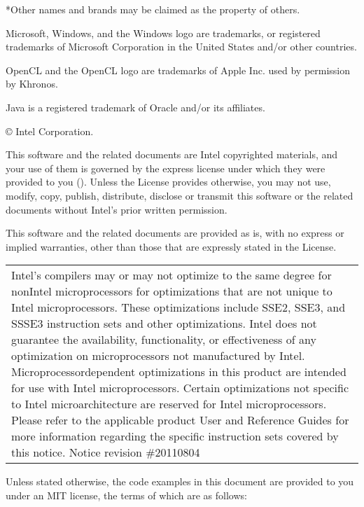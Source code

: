 \documentclass[letterpaper,10pt,english]{sphinxmanual}
\begin{document}
*Other names and brands may be claimed as the property of others.

Microsoft, Windows, and the Windows logo are trademarks, or registered
trademarks of Microsoft Corporation in the United States and/or other
countries.

OpenCL and the OpenCL logo are trademarks of Apple Inc. used by
permission by Khronos.

Java is a registered trademark of Oracle and/or its affiliates.

© Intel Corporation.

This software and the related documents are Intel copyrighted materials,
and your use of them is governed by the express license under which they
were provided to you (). Unless the License provides
otherwise, you may not use, modify, copy, publish, distribute, disclose
or transmit this software or the related documents without Intel’s prior
written permission.

This software and the related documents are provided as is, with no
express or implied warranties, other than those that are expressly
stated in the License.


\begin{savenotes}\sphinxattablestart
\centering
\begin{tabulary}{\linewidth}[t]{|T|}
\hline
\sphinxstyletheadfamily \\
\hline
Intel’s compilers may or may not optimize to the same    degree for non\sphinxhyphen{}Intel microprocessors for optimizations that are not   unique to Intel microprocessors. These optimizations include SSE2,   SSE3, and SSSE3 instruction sets and other optimizations. Intel does   not guarantee the availability, functionality, or effectiveness of   any optimization on microprocessors not manufactured by Intel.   Microprocessor\sphinxhyphen{}dependent optimizations in this product are intended   for use with Intel microprocessors. Certain optimizations not   specific to Intel microarchitecture are reserved for Intel   microprocessors. Please refer to the applicable product User and   Reference Guides for more information regarding the specific   instruction sets covered by this notice.        Notice   revision \#20110804
\\
\hline
\end{tabulary}
\par
\sphinxattableend\end{savenotes}

Unless stated otherwise, the code examples in this document are provided
to you under an MIT license, the terms of which are as follows:
\end{document}
